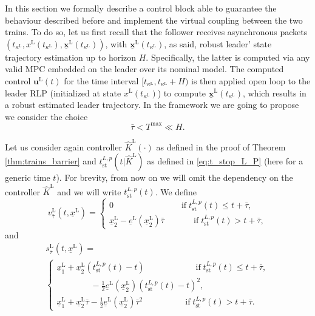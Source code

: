 \documentclass[letterpaper, 10 pt, conference]{ieeeconf}
\theoremstyle{definition}
\theoremstyle{nopoint}
\newcounter{Theorem}
\begin{document}
In this section we formally describe a control block able to guarantee the behaviour described before and implement the virtual coupling between the two trains.  
To do so, let us first recall that the follower receives asynchronous packets $\left ( t_{\kappa^\mathrm{L}}, x^\mathrm{L}(t_{\kappa^\mathrm{L}}),\underline{\mathbf{x}}^\mathrm{L}(t_{\kappa^\mathrm{L}})\right)$, with $\underline{\mathbf{x}}^\mathrm{L}(t_{\kappa^\mathrm{L}})$, as said, robust leader' state trajectory estimation up to horizon $H$. Specifically, the latter is computed via any valid MPC embedded on the leader over its nominal model. The computed control $\mathbf{u}^\mathrm{L}(t)$ for the time interval  $[t_{\kappa^\mathrm{L}},t_{\kappa^\mathrm{L}}+H)$ is then applied open loop to the leader RLP (initialized at state $x^\mathrm{L}(t_{\kappa^\mathrm{L}})$) to compute $\underline{\mathbf{x}}^\mathrm{L}(t_{\kappa^\mathrm{L}})$, which results in a robust estimated leader trajectory. 
In the framework we are going to propose we consider the choice
\begin{equation}\label{eq:tau_H_inequality}
\bar{\tau} < T^{\max}\ll H.
\end{equation}

Let us consider again controller $\hat{K}^\mathrm{L}(\cdot)$ as defined in the proof of Theorem \ref{thm:trains_barrier} and $t_{\mathrm{st}}^{L,p}(t |\hat{K}^\mathrm{L})$ as defined in \eqref{eq:t_stop_L_P} (here for a generic time $t$). For brevity, from now on we will omit the dependency on the controller $\hat{K}^\mathrm{L}$ and we will write $t_{\mathrm{st}}^{L,p}(t)$.
We define
\begin{equation}\label{eq:v_tau_L}
 	v_{\bar{\tau}}^\mathrm{L}\left( t,\underline{x}^\mathrm{L} \right)=
 	\begin{cases}
 		0 \qquad \qquad \qquad \quad  \quad \text{if} \; t_{\mathrm{st}}^{L,p}(t) \leq t+\bar{\tau}, \\
 		\underline{x}_2^\mathrm{L}-\underline{e}^\mathrm{L}\left(\underline{x}_2^\mathrm{L}\right)\bar{\tau} \qquad \quad \; \, \text{if} \; t_{\mathrm{st}}^{L,p}(t) > t+\bar{\tau},
 	\end{cases}
\end{equation}
and
 \begin{multline}\label{eq:s_tau_L}
 	s_{\bar{\tau}}^\mathrm{L}\left( t,\underline{x}^\mathrm{L} \right)=\\
 	\begin{cases}
 		\underline{x}_1^\mathrm{L}+ \underline{x}_2^\mathrm{L}\left( t_{\mathrm{st}}^{L,p}(t) -t \right) \qquad \qquad \qquad    \text{if} \; t_{\mathrm{st}}^{L,p}(t) \leq t+\bar{\tau}, \\ \qquad \qquad  -\frac{1}{2}\underline{e}^\mathrm{L}\left(\underline{x}_2^\mathrm{L} \right)\left(t_{\mathrm{st}}^{L,p}(t) -t \right)^2,  \\
 		\underline{x}_1^\mathrm{L}+ \underline{x}_2^\mathrm{L}\bar{\tau} - \frac{1}{2}\underline{e}^\mathrm{L}\left(\underline{x}_2^\mathrm{L} \right)\bar{\tau}^2 \quad \qquad \qquad \text{if}  \; t_{\mathrm{st}}^{L,p}(t) > t+\bar{\tau}.
 	\end{cases}
 \end{multline}
\end{document}
